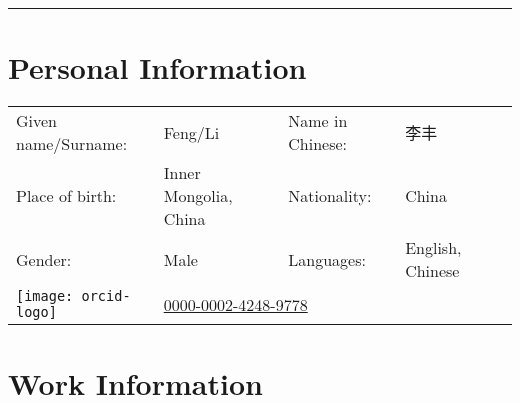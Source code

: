 \documentclass[twoside,a4paper,10.5pt]{article}
\begin{document}
\thispagestyle{plain}

\hrule
\section*{Personal Information}
\begin{tabular}{l p{4cm} l  l l}
  Given name/Surname:                      & Feng/Li               & Name in Chinese: & 李丰                                       \\
  Place of birth:                          & Inner Mongolia, China & Nationality:     & China                                      \\
  Gender:                                  & Male                  & Languages:       & English, Chinese                           \\
  \texttt{[image: orcid-logo]} & \multicolumn{3}{l}{\href{https://orcid.org/0000-0002-4248-9778}{0000-0002-4248-9778}} \\
\end{tabular}

\section*{Work Information}

\end{document}
